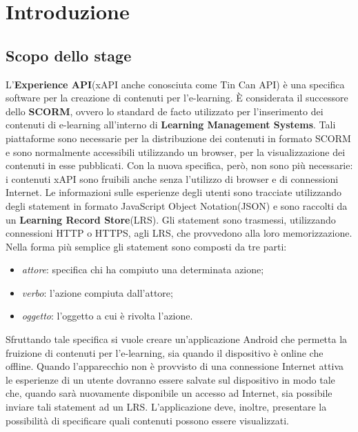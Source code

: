 \documentclass[../Tesi.tex]{subfiles}
\begin{document}
\section{Introduzione}\label{sec:introduzione}	
	\subsection{Scopo dello stage}
		L'\textbf{Experience API}(xAPI anche conosciuta come Tin Can API) è una specifica software per la creazione di contenuti per l'e-learning. È considerata il successore dello \textbf{SCORM}, ovvero lo standard de facto utilizzato per l'inserimento dei contenuti di e-learning all'interno di \textbf{Learning Management Systems}. Tali piattaforme sono necessarie per la distribuzione dei contenuti in formato SCORM e sono normalmente accessibili utilizzando un browser, per la visualizzazione dei contenuti in esse pubblicati. Con la nuova specifica, però, non sono più necessarie: i contenuti xAPI sono fruibili anche senza l'utilizzo di browser e di connessioni Internet. Le informazioni sulle esperienze degli utenti sono tracciate utilizzando degli statement in formato JavaScript Object Notation(JSON) e sono raccolti da un \textbf{Learning Record Store}(LRS). Gli statement sono trasmessi, utilizzando connessioni HTTP o HTTPS, agli LRS, che provvedono alla loro memorizzazione. Nella forma più semplice gli statement sono composti da tre parti: 
		\begin{itemize}
			\item \textit{attore}: specifica chi ha compiuto una determinata azione;
			\item \textit{verbo}: l'azione compiuta dall'attore;
			\item \textit{oggetto}: l'oggetto a cui è rivolta l'azione.
		\end{itemize}
		Sfruttando tale specifica si vuole creare un'applicazione Android che permetta la fruizione di contenuti per l'e-learning, sia quando il dispositivo è online che offline. Quando l'apparecchio non è provvisto di una connessione Internet attiva le esperienze di un utente dovranno essere salvate sul dispositivo in modo tale che, quando sarà nuovamente disponibile un accesso ad Internet, sia possibile inviare tali statement ad un LRS. L'applicazione deve, inoltre, presentare la possibilità di specificare quali contenuti possono essere visualizzati.
\end{document}
